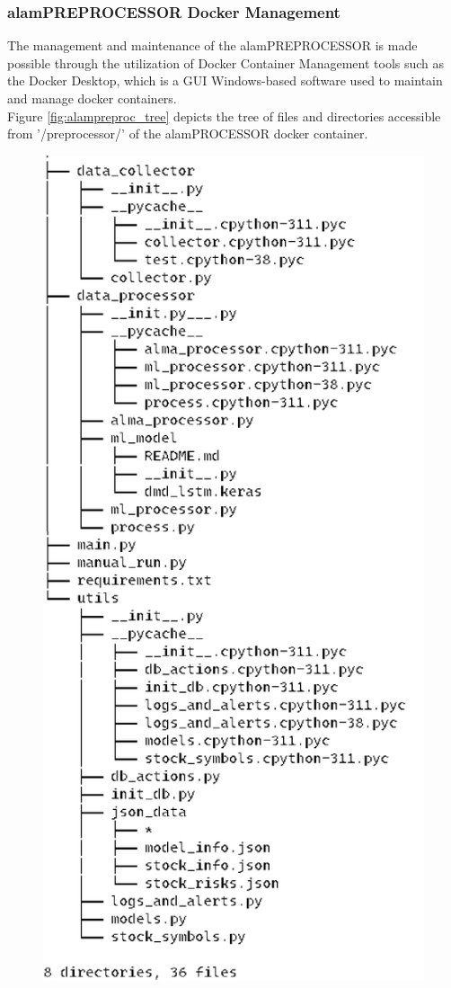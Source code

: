 \subsubsection{alamPREPROCESSOR Docker Management}
\label{subsubsec:alamPREPROCESSOR_docker_management}
The management and maintenance of the alamPREPROCESSOR is made possible
through the utilization of Docker Container Management tools
such as the Docker Desktop, which is a GUI Windows-based software
used to maintain and manage docker containers.
\\

Figure \ref{fig:alampreproc_tree} depicts the tree of files and directories accessible 
from '/preprocessor/' of the alamPROCESSOR docker container.
\begin{figure}[ht]
    \centering
    \includegraphics[height=0.60\textheight]{./assets/Chapter_4/Documentation/alampre_tree.png}

\end{figure}
